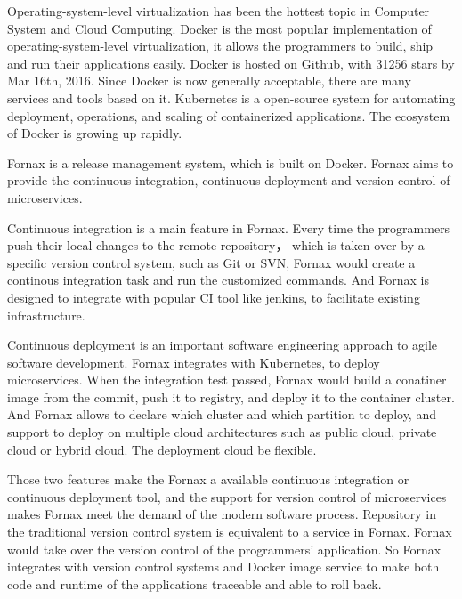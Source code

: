 \begin{bigabstract}
Operating-system-level virtualization has been the hottest topic in Computer System and Cloud Computing. Docker is the most popular implementation of operating-system-level virtualization, it allows the programmers to build, ship and run their applications easily. Docker is hosted on Github, with 31256 stars by Mar 16th, 2016. Since Docker is now generally acceptable, there are many services and tools based on it. Kubernetes is a open-source system for automating deployment, operations, and scaling of containerized applications. The ecosystem of Docker is growing up rapidly.

Fornax is a release management system, which is built on Docker. Fornax aims to provide the continuous integration, continuous deployment and version control of microservices. 

Continuous integration is a main feature in Fornax. Every time the programmers push their local changes to the remote repository， which is taken over by a specific version control system, such as Git or SVN, Fornax would create a continous integration task and run the customized commands. And Fornax is designed to integrate with popular CI tool like jenkins, to facilitate existing infrastructure. 

Continuous deployment is an important software engineering approach to agile software development. Fornax integrates with Kubernetes, to deploy microservices. When the integration test passed, Fornax would build a conatiner image from the commit, push it to registry, and deploy it to the container cluster. And Fornax allows to declare which cluster and which partition to deploy, and support to deploy on multiple cloud architectures such as public cloud, private cloud or hybrid cloud. The deployment cloud be flexible.

Those two features make the Fornax a available continuous integration or continuous deployment tool, and the support for version control of microservices makes Fornax meet the demand of the modern software process. Repository in the traditional version control system is equivalent to a service in Fornax. Fornax would take over the version control of the programmers' application. So Fornax integrates with version control systems and Docker image service to make both code and runtime of the applications traceable and able to roll back.


\end{bigabstract}
